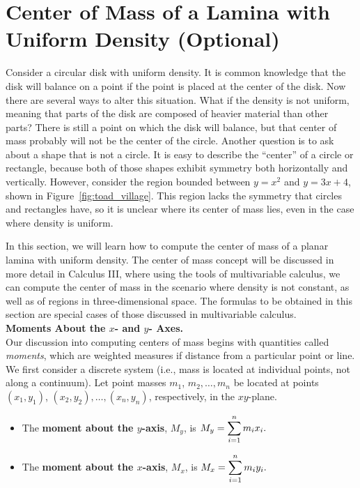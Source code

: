 \section{Center of Mass of a Lamina with Uniform Density (Optional)}\label{sec:center_of_mass_calc_ii}

Consider a circular disk with uniform density.  It is common knowledge that the disk will balance on a point if the point is placed at the center of the disk.  Now there are several ways to alter this situation.  What if the density is not uniform, meaning that parts of the disk are composed of heavier material than other parts?  There is still a point on which the disk will balance, but that center of mass probably will not be the center of the circle.  Another question is to ask about a shape that is not a circle.  It is easy to describe the ``center'' of a circle or rectangle, because both of those shapes exhibit symmetry both horizontally and vertically.  However, consider the region bounded between $y=x^2$ and $y=3x+4$, shown in Figure~\ref{fig:toad_village}.
This region lacks the symmetry that circles and rectangles have, so it is unclear where its center of mass lies, even in the case where density is uniform.


In this section, we will learn how to compute the center of mass of a planar lamina with uniform density.  The center of mass concept will be discussed in more detail in Calculus III, where using the tools of multivariable calculus, we can compute the center of mass in the scenario where density is not constant, as well as of regions in three-dimensional space.  The formulas to be obtained in this section are special cases of those discussed in multivariable calculus.\\

\noindent\textbf{\large Moments About the $x$- and $y$- Axes.}\\

Our discussion into computing centers of mass begins with quantities called {\it moments}, which are weighted measures if distance from a particular point or line.
We first consider a discrete system (i.e., mass is located at individual points, not along a continuum).  Let point masses $m_1$, $m_2,\ldots,m_n$ be located at points $(x_1,y_1)$, $(x_2,y_2),\ldots,(x_n,y_n)$, respectively, in the $xy$-plane.
\begin{itemize}
	\item The \textbf{moment about the $y$-axis}, $M_y$, is 
	$\displaystyle M_y = \sum_{i=1}^n m_ix_i.$
	\item The \textbf{moment about the $x$-axis}, $M_x$, is 
	$\displaystyle M_x = \sum_{i=1}^n m_iy_i.$
\end{itemize}


